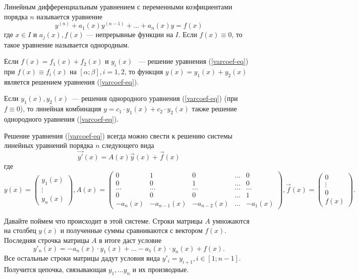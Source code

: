 \setcounter{equation}{0}

Линейным дифференциальным уравнением с переменными коэфициентами порядка $n$ называется уравнение
\begin{equation}\label{varcoef-eq}
    y^{(n)} + a_1(x)y^{(n-1)} + \ldots + a_n(x)y = f(x)
\end{equation}
где \(x \in I\) и \(a_j(x), f(x)\)  --- непрерывные функции на \(I\). Если \(f(x) \equiv 0\), то такое уравнение называется однородным.

\begin{lemma}\label{varcoef-solsumlemma}
Если  $f(x) = f_1(x) + f_2(x)$ и $y_i(x)$ ~--- решение уравнения (\ref{varcoef-eq}) при $f(x) \equiv f_i(x)$ на $[\alpha; \beta], i = 1, 2$, то функция \(y(x) = y_1(x) + y_2(x)\) является решением уравнения (\ref{varcoef-eq}).
\end{lemma}
\begin{corollary}
Если $y_1(x), y_2(x)$~--- решения однородного уравнения (\ref{varcoef-eq}) (при $f \equiv 0$), то линейная комбинация $y = c_1 \cdot y_1(x) + c_2 \cdot y_2(x)$ также решение однородного уравнения (\ref{varcoef-eq}).
\end{corollary}
Решение уравнения (\ref{varcoef-eq}) всегда можно свести к решению системы линейных уравнений порядка $n$ следующего вида
\begin{equation}\label{varcoef-sys}
    \vec{y'}(x) = A(x)\vec{y}(x) + \vec{f}(x)
\end{equation}
где 
\[
y(x) =
\begin{pmatrix}
y_1(x) \\
\vdots \\
y_n(x) 
\end{pmatrix},
A(x) = \begin{pmatrix}
0 & 1 & 0 & \ldots & 0 \\
0 & 0 & 1 & \ldots & 0 \\
\ldots & \ldots & \ldots & \ldots & \ldots \\
0 & 0 & 0 & \ldots & 1 \\
-a_n(x) & -a_{n-1}(x) & -a_{n-2}(x) & \ldots & -a_1(x)
\end{pmatrix},
\vec{f}(x) =
\begin{pmatrix}
0 \\
\vdots \\
0  \\
f(x)
\end{pmatrix}.
\]

Давайте поймем что происходит в этой системе. Строки матрицы $A$ умножаются на столбец $y(x)$ и полученные суммы сравниваются с вектором $f(x)$. Последняя строчка матрицы $A$ в итоге даст условие 
\[
y'_n(x) = -a_n(x) \cdot y_1(x) + \ldots - a_1(x) \cdot y_n(x) + f(x).
\]
Все остальные строки матрицы дадут условия вида \(y'_i = y_{i + 1}, i \in [1; n-1].\) Получится цепочка, связывающая \(y_1, \ldots y_n\) и их производные.

